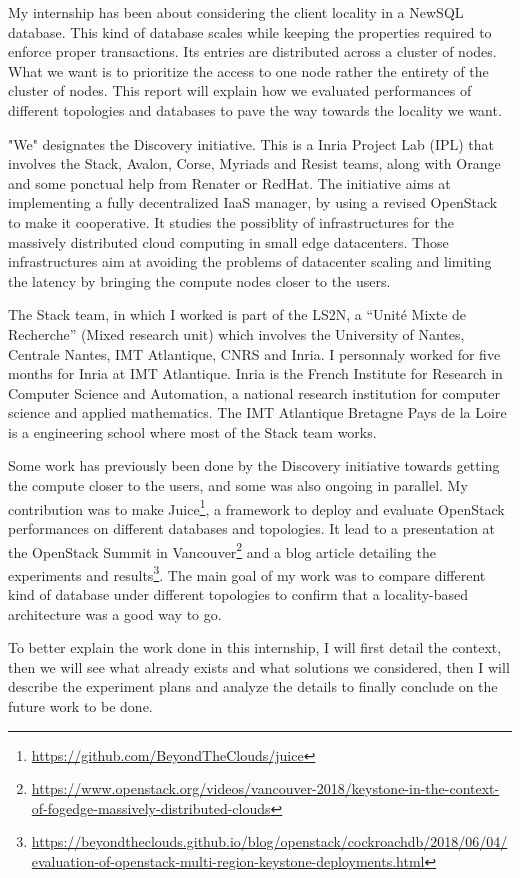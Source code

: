 My internship has been about considering the client locality in a NewSQL database. This kind of database scales while keeping the properties required to enforce proper transactions. Its entries are distributed across a cluster of nodes. What we want is to prioritize the access to one node rather the entirety of the cluster of nodes. This report will explain how we evaluated performances of different topologies and databases to pave the way towards the locality we want.

"We" designates the Discovery initiative\cite{discovery}. This is a Inria Project Lab (IPL) that involves the Stack, Avalon, Corse, Myriads and Resist teams, along with Orange and some ponctual help from Renater or RedHat. The initiative aims at implementing a fully decentralized IaaS manager, by using a revised OpenStack to make it cooperative. It studies the possiblity of infrastructures for the massively distributed cloud computing in small edge datacenters. Those infrastructures aim at avoiding the problems of datacenter scaling and limiting the latency by bringing the compute nodes closer to the users.


The Stack team, in which I worked is part of the LS2N, a ``Unité Mixte de Recherche'' (Mixed research unit) which involves the University of Nantes, Centrale Nantes, IMT Atlantique, CNRS and Inria. I personnaly worked for five months for Inria at IMT Atlantique. Inria is the French Institute for Research in Computer Science and Automation, a national research institution for computer science and applied mathematics. The IMT Atlantique Bretagne Pays de la Loire is a engineering school where most of the Stack team works.

Some work has previously been done by the Discovery initiative towards getting the compute closer to the users, and some was also ongoing in parallel. My contribution was to make Juice\footnote{\url{https://github.com/BeyondTheClouds/juice}}, a framework to deploy and evaluate OpenStack performances on different databases and topologies. It lead to a presentation at the OpenStack Summit in Vancouver\footnote{\url{https://www.openstack.org/videos/vancouver-2018/keystone-in-the-context-of-fogedge-massively-distributed-clouds}} and a blog article detailing the experiments and results\footnote{\url{https://beyondtheclouds.github.io/blog/openstack/cockroachdb/2018/06/04/evaluation-of-openstack-multi-region-keystone-deployments.html}}. The main goal of my work was to compare different kind of database under different topologies to confirm that a locality-based architecture was a good way to go.

To better explain the work done in this internship, I will first detail the context, then we will see what already exists and what solutions we considered, then I will describe the experiment plans and analyze the details to finally conclude on the future work to be done.
